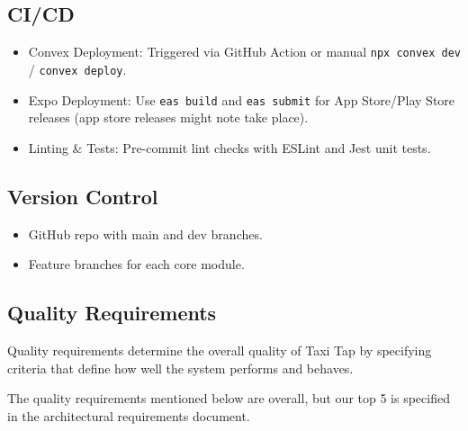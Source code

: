 \documentclass[a4paper,12pt]{article}
\begin{document}
\subsection{CI/CD}
\begin{itemize}
    \item Convex Deployment: Triggered via GitHub Action or manual \texttt{npx convex dev} / \texttt{convex deploy}.
    \item Expo Deployment: Use \texttt{eas build} and \texttt{eas submit} for App Store/Play Store releases (app store releases might note take place).
    \item Linting \& Tests: Pre-commit lint checks with ESLint and Jest unit tests.
\end{itemize}

\subsection{Version Control}
\begin{itemize}
    \item GitHub repo with main and dev branches.
    \item Feature branches for each core module.
\end{itemize}

\subsection{Quality Requirements}
Quality requirements determine the overall quality of Taxi Tap by specifying criteria that define how well the system performs and behaves.\newline

The quality requirements mentioned below are overall, but our top 5 is specified in the architectural requirements document.
\end{document}
